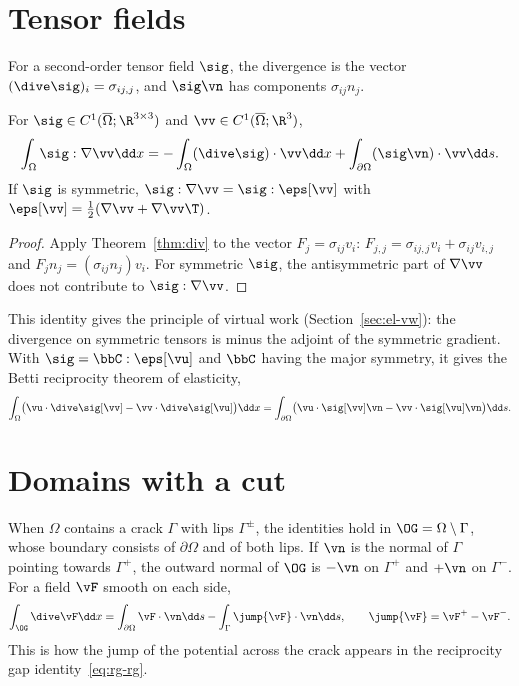 \section{Tensor fields}
For a second-order tensor field $\sig$, the divergence is the vector
$(\dive\sig)_i=\sigma_{ij,j}$, and $\sig\vn$ has components $\sigma_{ij}n_j$.

\begin{theorem}\label{thm:ibp-tensor}
For $\sig\in C^1(\overline\Omega;\R^{3\times3})$ and
$\vv\in C^1(\overline\Omega;\R^3)$,
\[
  \int_\Omega\sig:\nabla\vv\dd x=-\int_\Omega(\dive\sig)\cdot\vv\dd x
  +\int_{\partial\Omega}(\sig\vn)\cdot\vv\dd s .
\]
If $\sig$ is symmetric, $\sig:\nabla\vv=\sig:\eps[\vv]$ with
$\eps[\vv]=\tfrac12(\nabla\vv+\nabla\vv\T)$.
\end{theorem}
\begin{proof}
Apply Theorem~\ref{thm:div} to the vector $F_j=\sigma_{ij}v_i$:
$F_{j,j}=\sigma_{ij,j}v_i+\sigma_{ij}v_{i,j}$ and $F_jn_j=(\sigma_{ij}n_j)v_i$.
For symmetric $\sig$, the antisymmetric part of $\nabla\vv$ does not
contribute to $\sig:\nabla\vv$.
\end{proof}
This identity gives the principle of virtual work (Section~\ref{sec:el-vw}):
the divergence on symmetric tensors is minus the adjoint of the symmetric
gradient. With $\sig=\bbC:\eps[\vu]$ and $\bbC$ having the major symmetry, it
gives the Betti reciprocity theorem of elasticity,
\[
  \int_\Omega\bigl(\vu\cdot\dive\sig[\vv]-\vv\cdot\dive\sig[\vu]\bigr)\dd x
  =\int_{\partial\Omega}\bigl(\vu\cdot\sig[\vv]\vn-\vv\cdot\sig[\vu]\vn\bigr)\dd s .
\]

\section{Domains with a cut}
When $\Omega$ contains a crack $\Gamma$ with lips $\Gamma^\pm$, the identities
hold in $\OG=\Omega\setminus\Gamma$, whose boundary consists of $\partial\Omega$
and of both lips. If $\vn$ is the normal of $\Gamma$ pointing towards
$\Gamma^+$, the outward normal of $\OG$ is $-\vn$ on $\Gamma^+$ and $+\vn$ on
$\Gamma^-$. For a field $\vF$ smooth on each side,
\[
  \int_{\OG}\dive\vF\dd x=\int_{\partial\Omega}\vF\cdot\vn\dd s
  -\int_\Gamma\jump{\vF}\cdot\vn\dd s,\qquad\jump{\vF}=\vF^+-\vF^- .
\]
This is how the jump of the potential across the crack appears in the
reciprocity gap identity~\eqref{eq:rg-rg}.

